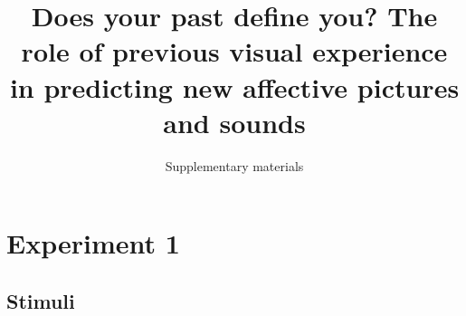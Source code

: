 \documentclass[
]{article}
\title{Does your past define you? The role of previous visual experience in predicting new affective pictures and sounds}
\subtitle{Supplementary materials}
\author{}
\date{\vspace{-2.5em}}
\begin{document}
\maketitle

{
\setcounter{tocdepth}{2}
\tableofcontents
}
\hypertarget{experiment-1}{%
\section{Experiment 1}\label{experiment-1}}

\hypertarget{stimuli}{%
\subsection{Stimuli}\label{stimuli}}

\providecommand{\docline}[3]{\noalign{\global\setlength{\arrayrulewidth}{#1}}\arrayrulecolor[HTML]{#2}\cline{#3}}

\setlength{\tabcolsep}{2pt}

\renewcommand*{\arraystretch}{1.5}
\end{document}
